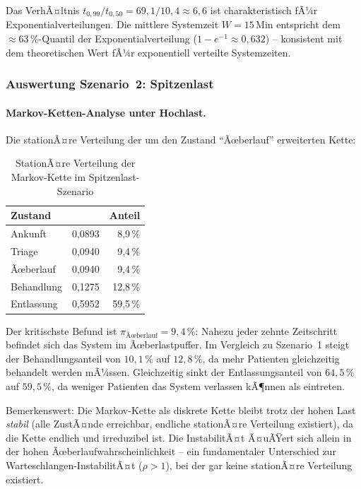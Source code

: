 ﻿\documentclass[a4paper,12pt]{scrreprt}
\theoremstyle{definition}
\begin{document}
Das VerhÃ¤ltnis $t_{0{,}99}/t_{0{,}50} = 69{,}1/10{,}4 \approx 6{,}6$ ist
charakteristisch fÃ¼r Exponentialverteilungen. Die mittlere Systemzeit
$W = 15$\,Min entspricht dem $\approx 63$\,\%-Quantil der Exponentialverteilung
($1 - e^{-1} \approx 0{,}632$) -- konsistent mit dem theoretischen Wert fÃ¼r
exponentiell verteilte Systemzeiten.

\subsubsection{Auswertung Szenario~2: Spitzenlast}

\paragraph{Markov-Ketten-Analyse unter Hochlast.}
Die stationÃ¤re Verteilung der um den Zustand ``Ãœberlauf'' erweiterten Kette:

\begin{table}[H]
	\centering
	\begin{tabular}{@{}lrr@{}}
		\toprule
		\textbf{Zustand} & \boldmath{$\pi_i$} & \textbf{Anteil} \\
		\midrule
		Ankunft     & 0{,}0893 &  8{,}9\,\% \\
		Triage      & 0{,}0940 &  9{,}4\,\% \\
		Ãœberlauf    & 0{,}0940 &  9{,}4\,\% \\
		Behandlung  & 0{,}1275 & 12{,}8\,\% \\
		Entlassung  & 0{,}5952 & 59{,}5\,\% \\
		\bottomrule
	\end{tabular}
	\caption{StationÃ¤re Verteilung der Markov-Kette im Spitzenlast-Szenario}
	\label{tab:pi-hochlast}
\end{table}

Der kritischste Befund ist $\pi_\text{Ãœberlauf} = 9{,}4\,\%$: Nahezu jeder
zehnte Zeitschritt befindet sich das System im Ãœberlastpuffer. Im Vergleich
zu Szenario~1 steigt der Behandlungsanteil von $10{,}1\,\%$ auf $12{,}8\,\%$,
da mehr Patienten gleichzeitig behandelt werden mÃ¼ssen. Gleichzeitig sinkt
der Entlassungsanteil von $64{,}5\,\%$ auf $59{,}5\,\%$, da weniger Patienten
das System verlassen kÃ¶nnen als eintreten.

Bemerkenswert: Die Markov-Kette als diskrete Kette bleibt trotz der hohen
Last \emph{stabil} (alle ZustÃ¤nde erreichbar, endliche stationÃ¤re Verteilung
existiert), da die Kette endlich und irreduzibel ist. Die InstabilitÃ¤t
Ã¤uÃŸert sich allein in der hohen Ãœberlaufwahrscheinlichkeit -- ein
fundamentaler Unterschied zur Warteschlangen-InstabilitÃ¤t ($\rho > 1$),
bei der gar keine stationÃ¤re Verteilung existiert.
\end{document}
